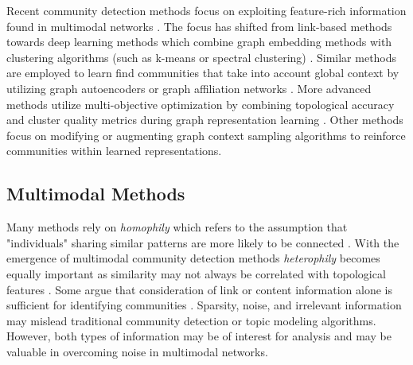 Recent community detection methods focus on exploiting feature-rich information found in multimodal networks \cite{suComprehensiveSurveyCommunity2022}. 
The focus has shifted from link-based methods towards deep learning methods which combine graph embedding methods with clustering algorithms (such as k-means or spectral clustering) \cite{tianLearningDeepRepresentations2014, kozdobaCommunityDetectionMeasure2015}. Similar methods are employed to learn find communities that take into account global context by utilizing graph autoencoders \cite{wangCommunityPreservingNetwork, caoIncorporatingNetworkStructure2018} or graph affiliation networks \cite{yangCommunityAffiliationGraphModel2012}.
%
More advanced methods utilize multi-objective optimization by combining topological accuracy and cluster quality metrics during graph representation learning \cite{cavallariLearningCommunityEmbedding2017, rozemberczkiGEMSECGraphEmbedding2019, wangCombiningGraphConvolutional2021, zhangCommDGICommunityDetection2020}. Other methods focus on modifying \cite{jiaCommunityGANCommunityDetection2019} or augmenting \cite{kangCommunityReinforcementEffective2021} graph context sampling algorithms to reinforce communities within learned representations. 

\subsection{Multimodal Methods}
Many methods rely on \textit{homophily} which refers to the assumption that "individuals" sharing similar patterns are more likely to be connected \cite{mcphersonBirdsFeatherHomophily2001}.
With the emergence of multimodal community detection methods \textit{heterophily} becomes equally important as similarity may not always be correlated with topological features \cite{zhuHomophilyGraphNeural}.
%
Some argue that consideration of link or content information alone is sufficient for identifying communities \cite{faniUserCommunityDetection2020}. Sparsity, noise, and irrelevant information may mislead traditional community detection or topic modeling algorithms.
However, both types of information may be of interest for analysis and may be valuable in overcoming noise in multimodal networks.

